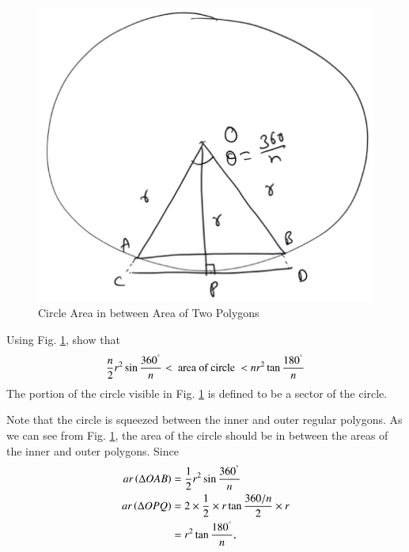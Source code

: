 \begin{figure}[!h]
	\begin{center}
		
		\includegraphics[width=\columnwidth]{./figs/ch5_circle_squeeze}
		\vspace*{-10cm}
	\end{center}
	\caption{Circle Area in between Area of Two Polygons}
	\label{ch5_circle_squeeze}	
\end{figure}
%
\begin{problem}
	Using Fig. \ref{ch5_circle_squeeze}, show that
%
\begin{equation}
\label{ch5_circle_squeeze_eq}
\frac{n}{2}r^{2}\sin\frac{360^{\degree}}{n} < \text{ area of circle } < nr^{2}\tan\frac{180^{\degree}}{n}
\end{equation}
%
The portion of the circle visible in Fig. \ref{ch5_circle_squeeze} is defined to be a sector of the circle.
\end{problem}
\proof Note that the circle is squeezed between the inner and outer regular polygons.  As we can see from Fig. \ref{ch5_circle_squeeze}, the area of the circle should be in between the areas of the inner and outer polygons.  Since
%
\begin{align}
ar \left(\Delta OAB\right) &= \frac{1}{2}r^{2}\sin\frac{360^{\degree}}{n} \\
ar \left(\Delta OPQ\right) &= 2 \times \frac{1}{2} \times r \tan\frac{360/n}{2} \times r \\
&= r^{2}\tan\frac{180^{\degree}}{n},
\end{align}
